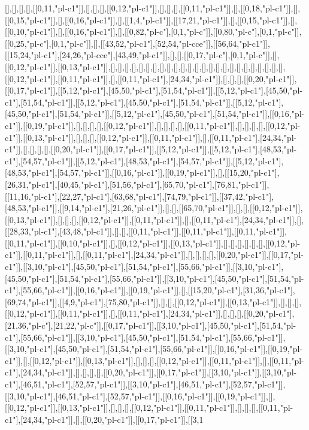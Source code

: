 [],[],[],[],[[0,11,"pl-c1"]],[],[],[],[[0,12,"pl-c1"]],[],[],[],[[0,11,"pl-c1"]],[],[[0,18,"pl-c1"]],[],[[0,15,"pl-c1"]],[],[[0,16,"pl-c1"]],[],[[1,4,"pl-c1"]],[[17,21,"pl-c1"]],[],[[0,15,"pl-c1"]],[],[[0,10,"pl-c1"]],[],[[0,16,"pl-c1"]],[],[[0,82,"pl-c"],[0,1,"pl-c"]],[[0,80,"pl-c"],[0,1,"pl-c"]],[[0,25,"pl-c"],[0,1,"pl-c"]],[],[[43,52,"pl-c1"],[52,54,"pl-cce"]],[[56,64,"pl-c1"]],[[15,24,"pl-c1"],[24,26,"pl-cce"],[43,49,"pl-c1"]],[],[],[[0,17,"pl-c"],[0,1,"pl-c"]],[],[[0,12,"pl-c1"]],[[0,13,"pl-c1"]],[],[],[],[],[],[],[],[],[],[],[],[],[],[],[],[],[],[],[],[],[],[],[],[],[],[[0,12,"pl-c1"]],[[0,11,"pl-c1"]],[],[[0,11,"pl-c1"],[24,34,"pl-c1"]],[],[],[],[[0,20,"pl-c1"]],[[0,17,"pl-c1"]],[[5,12,"pl-c1"],[45,50,"pl-c1"],[51,54,"pl-c1"]],[[5,12,"pl-c1"],[45,50,"pl-c1"],[51,54,"pl-c1"]],[[5,12,"pl-c1"],[45,50,"pl-c1"],[51,54,"pl-c1"]],[[5,12,"pl-c1"],[45,50,"pl-c1"],[51,54,"pl-c1"]],[[5,12,"pl-c1"],[45,50,"pl-c1"],[51,54,"pl-c1"]],[[0,16,"pl-c1"]],[[0,19,"pl-c1"]],[],[],[],[],[[0,12,"pl-c1"]],[],[],[],[],[[0,11,"pl-c1"]],[],[],[],[],[[0,12,"pl-c1"]],[[0,13,"pl-c1"]],[],[],[],[[0,12,"pl-c1"]],[[0,11,"pl-c1"]],[],[[0,11,"pl-c1"],[24,34,"pl-c1"]],[],[],[],[],[[0,20,"pl-c1"]],[[0,17,"pl-c1"]],[[5,12,"pl-c1"]],[[5,12,"pl-c1"],[48,53,"pl-c1"],[54,57,"pl-c1"]],[[5,12,"pl-c1"],[48,53,"pl-c1"],[54,57,"pl-c1"]],[[5,12,"pl-c1"],[48,53,"pl-c1"],[54,57,"pl-c1"]],[[0,16,"pl-c1"]],[[0,19,"pl-c1"]],[],[[15,20,"pl-c1"],[26,31,"pl-c1"],[40,45,"pl-c1"],[51,56,"pl-c1"],[65,70,"pl-c1"],[76,81,"pl-c1"]],[[11,16,"pl-c1"],[22,27,"pl-c1"],[63,68,"pl-c1"],[74,79,"pl-c1"]],[[37,42,"pl-c1"],[48,53,"pl-c1"]],[[9,14,"pl-c1"],[21,26,"pl-c1"]],[],[],[[65,70,"pl-c1"]],[],[],[[0,12,"pl-c1"]],[[0,13,"pl-c1"]],[],[],[],[[0,12,"pl-c1"]],[[0,11,"pl-c1"]],[],[[0,11,"pl-c1"],[24,34,"pl-c1"]],[],[[28,33,"pl-c1"],[43,48,"pl-c1"]],[],[],[[0,11,"pl-c1"]],[[0,11,"pl-c1"]],[[0,11,"pl-c1"]],[[0,11,"pl-c1"]],[[0,10,"pl-c1"]],[],[[0,12,"pl-c1"]],[[0,13,"pl-c1"]],[],[],[],[],[],[],[[0,12,"pl-c1"]],[[0,11,"pl-c1"]],[],[[0,11,"pl-c1"],[24,34,"pl-c1"]],[],[],[],[],[[0,20,"pl-c1"]],[[0,17,"pl-c1"]],[[3,10,"pl-c1"],[45,50,"pl-c1"],[51,54,"pl-c1"],[55,66,"pl-c1"]],[[3,10,"pl-c1"],[45,50,"pl-c1"],[51,54,"pl-c1"],[55,66,"pl-c1"]],[[3,10,"pl-c1"],[45,50,"pl-c1"],[51,54,"pl-c1"],[55,66,"pl-c1"]],[[0,16,"pl-c1"]],[[0,19,"pl-c1"]],[],[[15,20,"pl-c1"],[31,36,"pl-c1"],[69,74,"pl-c1"]],[[4,9,"pl-c1"],[75,80,"pl-c1"]],[],[],[[0,12,"pl-c1"]],[[0,13,"pl-c1"]],[],[],[],[[0,12,"pl-c1"]],[[0,11,"pl-c1"]],[],[[0,11,"pl-c1"],[24,34,"pl-c1"]],[],[],[],[[0,20,"pl-c1"],[21,36,"pl-c"],[21,22,"pl-c"]],[[0,17,"pl-c1"]],[[3,10,"pl-c1"],[45,50,"pl-c1"],[51,54,"pl-c1"],[55,66,"pl-c1"]],[[3,10,"pl-c1"],[45,50,"pl-c1"],[51,54,"pl-c1"],[55,66,"pl-c1"]],[[3,10,"pl-c1"],[45,50,"pl-c1"],[51,54,"pl-c1"],[55,66,"pl-c1"]],[[0,16,"pl-c1"]],[[0,19,"pl-c1"]],[],[[0,12,"pl-c1"]],[[0,13,"pl-c1"]],[],[],[],[[0,12,"pl-c1"]],[[0,11,"pl-c1"]],[],[[0,11,"pl-c1"],[24,34,"pl-c1"]],[],[],[],[],[[0,20,"pl-c1"]],[[0,17,"pl-c1"]],[[3,10,"pl-c1"]],[[3,10,"pl-c1"],[46,51,"pl-c1"],[52,57,"pl-c1"]],[[3,10,"pl-c1"],[46,51,"pl-c1"],[52,57,"pl-c1"]],[[3,10,"pl-c1"],[46,51,"pl-c1"],[52,57,"pl-c1"]],[[0,16,"pl-c1"]],[[0,19,"pl-c1"]],[],[[0,12,"pl-c1"]],[[0,13,"pl-c1"]],[],[],[],[[0,12,"pl-c1"]],[[0,11,"pl-c1"]],[],[],[],[[0,11,"pl-c1"],[24,34,"pl-c1"]],[],[[0,20,"pl-c1"]],[[0,17,"pl-c1"]],[[3,1